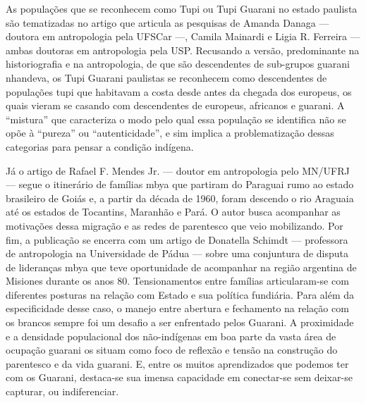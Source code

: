 \documentclass{article}
\begin{document}
As popula\c{c}\~oes que se reconhecem como Tupi ou Tupi Guarani no
estado paulista s\~ao tematizadas no artigo que articula as pesquisas
de Amanda Danaga --- doutora em antropologia pela UFSCar ---, Camila
Mainardi e Ligia R. Ferreira --- ambas doutoras em antropologia pela
USP. Recusando a vers\~ao, predominante na historiografia e na
antropologia, de que s\~ao descendentes de sub-grupos guarani nhandeva,
os Tupi Guarani paulistas se reconhecem como descendentes de
popula\c{c}\~oes tupi que habitavam a costa desde antes da chegada dos
europeus, os quais vieram se casando com descendentes de europeus,
africanos e guarani. A {\textquotedblleft}mistura{\textquotedblright}
que caracteriza o modo pelo qual essa popula\c{c}\~ao se identifica
n\~ao se op\~oe \`a {\textquotedblleft}pureza{\textquotedblright} ou
{\textquotedblleft}autenticidade{\textquotedblright}, e sim implica a
problematiza\c{c}\~ao dessas categorias para pensar a condi\c{c}\~ao
ind\'igena. 

J\'a o artigo de Rafael F. Mendes Jr. --- doutor em antropologia pelo
MN/UFRJ --- segue o itiner\'ario de fam\'ilias mbya que partiram do
Paraguai rumo ao estado brasileiro de Goi\'as e, a partir da d\'ecada
de 1960, foram descendo o rio Araguaia at\'e os estados de Tocantins,
Maranh\~ao e Par\'a. O autor busca acompanhar as motiva\c{c}\~oes dessa
migra\c{c}\~ao e as redes de parentesco que veio mobilizando. Por fim,
a publica\c{c}\~ao se encerra com um artigo de Donatella Schimdt ---
professora de antropologia na Universidade de P\'adua --- sobre uma
conjuntura de disputa de lideran\c{c}as mbya que teve oportunidade de
acompanhar na regi\~ao argentina de Misiones durante os anos 80.
Tensionamentos entre fam\'ilias articularam-se com diferentes posturas
na rela\c{c}\~ao com Estado e sua pol\'itica fundi\'aria. Para al\'em
da especificidade desse caso, o manejo entre abertura e fechamento na
rela\c{c}\~ao com os brancos sempre foi um desafio a ser enfrentado
pelos Guarani. A proximidade e a densidade populacional dos
n\~ao-ind\'igenas em boa parte da vasta \'area de ocupa\c{c}\~ao
guarani os situam como foco de reflex\~ao e tens\~ao na
constru\c{c}\~ao do parentesco e da vida guarani. E, entre os muitos
aprendizados que podemos ter com os Guarani, destaca-se sua imensa
capacidade em conectar-se sem deixar-se capturar, ou indiferenciar.
\end{document}
